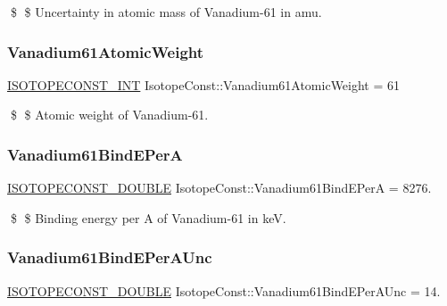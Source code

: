 \$ \$ Uncertainty in atomic mass of Vanadium-\/61 in amu. \mbox{\label{group___isotope_const-_vanadium-_v61_ga5d5eb001a200237c54af6582c6ad8067}} 
\subsubsection{\texorpdfstring{Vanadium61\+Atomic\+Weight}{Vanadium61AtomicWeight}}
{\footnotesize\ttfamily \mbox{\hyperlink{group___isotope_const-_macros_ga5f18360b3e99483a35c32d789e62621c}{I\+S\+O\+T\+O\+P\+E\+C\+O\+N\+S\+T\+\_\+\+I\+NT}} Isotope\+Const\+::\+Vanadium61\+Atomic\+Weight = 61}

\$ \$ Atomic weight of Vanadium-\/61. \mbox{\label{group___isotope_const-_vanadium-_v61_ga20cbacef4d194a773c67fa2182e7d6f6}} 
\subsubsection{\texorpdfstring{Vanadium61\+Bind\+E\+PerA}{Vanadium61BindEPerA}}
{\footnotesize\ttfamily \mbox{\hyperlink{group___isotope_const-_macros_ga8f45a7272ce02c0b4c65c44636ed719a}{I\+S\+O\+T\+O\+P\+E\+C\+O\+N\+S\+T\+\_\+\+D\+O\+U\+B\+LE}} Isotope\+Const\+::\+Vanadium61\+Bind\+E\+PerA = 8276.}

\$ \$ Binding energy per A of Vanadium-\/61 in keV. \mbox{\label{group___isotope_const-_vanadium-_v61_gaafa7aa1ca4e384cdf36dc977a0a8d386}} 
\subsubsection{\texorpdfstring{Vanadium61\+Bind\+E\+Per\+A\+Unc}{Vanadium61BindEPerAUnc}}
{\footnotesize\ttfamily \mbox{\hyperlink{group___isotope_const-_macros_ga8f45a7272ce02c0b4c65c44636ed719a}{I\+S\+O\+T\+O\+P\+E\+C\+O\+N\+S\+T\+\_\+\+D\+O\+U\+B\+LE}} Isotope\+Const\+::\+Vanadium61\+Bind\+E\+Per\+A\+Unc = 14.}

